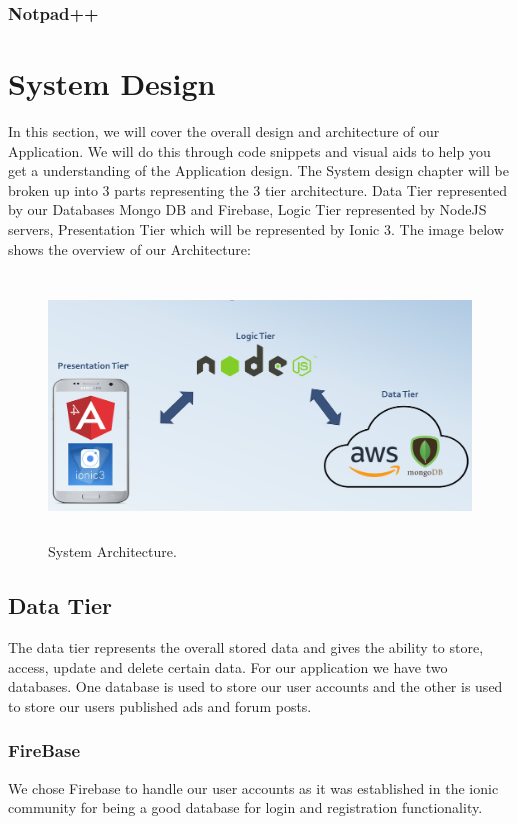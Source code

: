 \subsection{Notpad++}

\chapter{System Design}

In this section, we will cover the overall design and architecture of our Application. We will do this through code snippets and visual aids to help you get a understanding of the Application design. The System design chapter will be broken up into 3 parts representing the 3 tier architecture. Data Tier represented by our Databases Mongo DB and Firebase, Logic Tier represented by NodeJS servers, Presentation Tier which will be represented by Ionic 3.
The image below shows the overview of our Architecture:

\begin{figure}[h]
\centering
\includegraphics[width=14cm, height=7cm]{img/Architecture}
\caption{System Architecture.}
\end{figure}

\section{Data Tier}

The data tier represents the overall stored data and gives the ability to store, access, update and delete certain data. For our application we have two databases. One database is used to store our user accounts and the other is used to store our users published ads and forum posts.

\subsection{FireBase}
We chose Firebase to handle our user accounts as it was established in the ionic community for being a good database for login and registration functionality.

